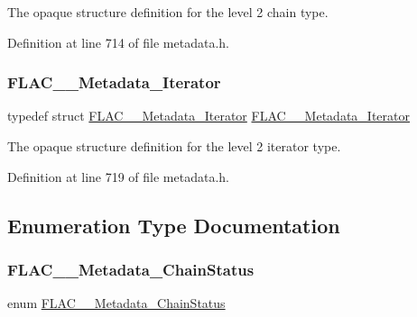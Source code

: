 The opaque structure definition for the level 2 chain type. 

Definition at line 714 of file metadata.\+h.

\mbox{\label{group__flac__metadata__level2_ga9f3e135a07cdef7e51597646aa7b89b2}} 
\subsubsection{\texorpdfstring{FLAC\_\_Metadata\_Iterator}{FLAC\_\_Metadata\_Iterator}}
{\footnotesize\ttfamily typedef struct \mbox{\hyperlink{group__flac__metadata__level2_ga9f3e135a07cdef7e51597646aa7b89b2}{F\+L\+A\+C\+\_\+\+\_\+\+Metadata\+\_\+\+Iterator}} \mbox{\hyperlink{group__flac__metadata__level2_ga9f3e135a07cdef7e51597646aa7b89b2}{F\+L\+A\+C\+\_\+\+\_\+\+Metadata\+\_\+\+Iterator}}}

The opaque structure definition for the level 2 iterator type. 

Definition at line 719 of file metadata.\+h.



\subsection{Enumeration Type Documentation}
\mbox{\label{group__flac__metadata__level2_gafe2a924893b0800b020bea8160fd4531}} 
\subsubsection{\texorpdfstring{FLAC\_\_Metadata\_ChainStatus}{FLAC\_\_Metadata\_ChainStatus}}
{\footnotesize\ttfamily enum \mbox{\hyperlink{group__flac__metadata__level2_gafe2a924893b0800b020bea8160fd4531}{F\+L\+A\+C\+\_\+\+\_\+\+Metadata\+\_\+\+Chain\+Status}}}

